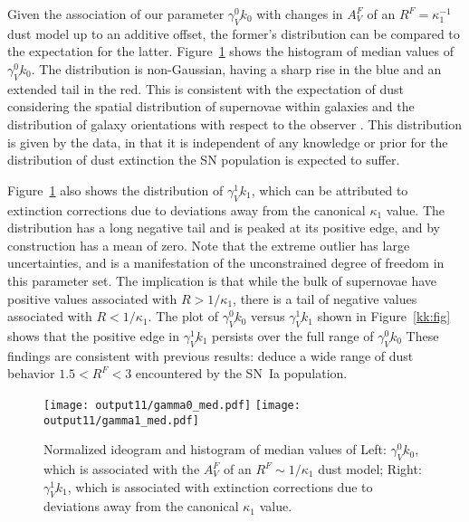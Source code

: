 \documentclass{aastex61}   	%
\begin{document}
Given the association of  our parameter $\gamma^0_V k_0$ with changes in $A^F_V$ of an $R^F =\kappa^{-1}_1$ dust model up to an additive offset,
the former's distribution can be compared to the expectation for the latter.
Figure~\ref{k0_med:fig} shows the histogram of
median values of $\gamma^0_V k_0$.
The distribution is non-Gaussian, having a sharp rise in the blue and an extended tail in the red.  This is consistent
with the expectation of dust considering the spatial distribution of supernovae within galaxies and the distribution of galaxy orientations with respect to the observer \citep{1998ApJ...502..177H}.  This distribution is given by the data, in that it is independent of any knowledge or prior
for the distribution of dust extinction the SN population is expected to suffer. 

Figure~\ref{k0_med:fig} also shows the distribution of $\gamma^1_V k_1$, which can be attributed to 
extinction corrections due to deviations away from the canonical $\kappa_1$ value.   The distribution has a long
negative tail and is peaked at its positive edge, and by construction has a mean of zero.
\color{orange}
Note that the extreme outlier has large uncertainties, and is a manifestation of the unconstrained degree of freedom in this parameter set.
\color{black}
The implication is that while the bulk of supernovae have positive values associated with $R>1/\kappa_1$, there is a tail
of negative values associated with $R<1/\kappa_1$.  The plot of   $\gamma^0_V k_0$ versus $\gamma^1_V k_1$  shown in Figure~\ref{kk:fig} shows that
the positive edge in $\gamma^1_V k_1$ persists over the full range of  $\gamma^0_V k_0$
These findings are consistent with previous results:
\citet{2014ApJ...789...32B, 2015MNRAS.453.3300A} deduce a wide range of dust behavior $1.5<R^F<3$ encountered by the SN~Ia population.

\begin{figure}[htbp] %
   \centering
   \texttt{[image: output11/gamma0\_med.pdf]}
   \texttt{[image: output11/gamma1\_med.pdf]}
      \caption{
      \color{orange} Normalized ideogram and histogram 
      \color{black}
      of
median values of Left: $\gamma^0_V k_0$, which is associated with the $A^F_V$ of an $R^F \sim 1/\kappa_1$ dust model; Right: $\gamma^1_V k_1$,
which  is associated with extinction corrections due to deviations away from the canonical $\kappa_1$ value.
   \label{k0_med:fig}}
\end{figure}
\end{document}
